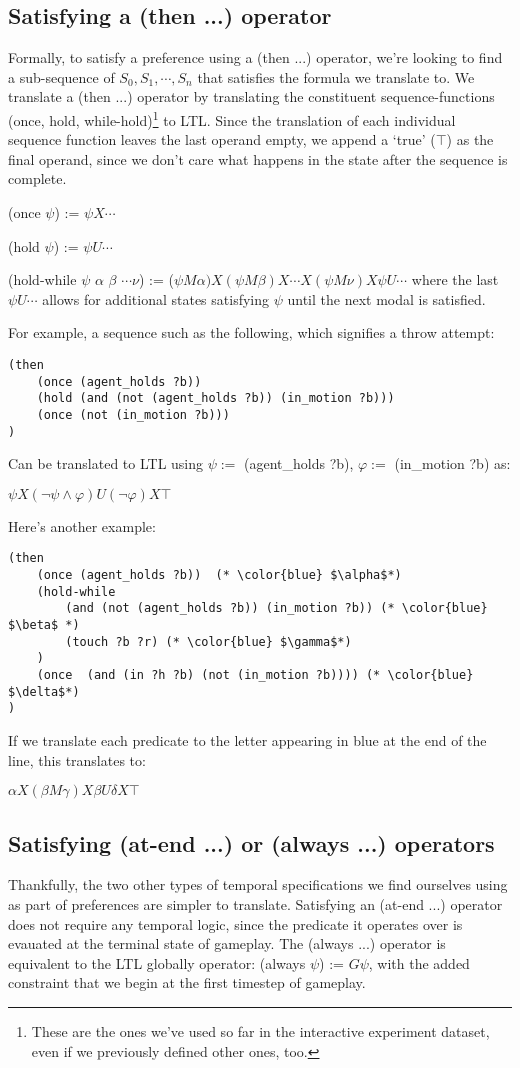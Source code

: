 \documentclass{article}
\begin{document}
\subsection{Satisfying a (then ...) operator}
Formally, to satisfy a preference using a (then ...) operator, we're looking to find a sub-sequence of $S_0, S_1, \cdots, S_n$ that satisfies the formula we translate to. 
We translate a (then ...) operator by translating the constituent sequence-functions (once, hold, while-hold)\footnote{These are the ones we've used so far in the interactive experiment dataset, even if we previously defined other ones, too.} to LTL. 
Since the translation of each individual sequence function leaves the last operand empty, we append a `true' ($\top$) as the final operand, since we don't care what happens in the state after the sequence is complete. 

(once $\psi$) := $\psi X \cdots$

(hold $\psi$) := $\psi U \cdots$

(hold-while $\psi$ $\alpha$ $\beta$ $\cdots \nu$) := ($\psi M \alpha) X (\psi M \beta) X \cdots X (\psi M \nu) X \psi U \cdots$ where the last $\psi U \cdots$ allows for additional states satisfying $\psi$ until the next modal is satisfied.

For example, a sequence such as the following, which signifies a throw attempt:
\begin{lstlisting}
(then
    (once (agent_holds ?b))
    (hold (and (not (agent_holds ?b)) (in_motion ?b))) 
    (once (not (in_motion ?b)))
)
\end{lstlisting}
Can be translated to LTL using $\psi:=$ (agent_holds ?b), $\varphi:=$ (in_motion ?b) as:

$\psi X (\neg \psi \wedge \varphi) U (\neg \varphi) X \top $

Here's another example: 
\begin{lstlisting}
(then 
    (once (agent_holds ?b))  (* \color{blue} $\alpha$*)
    (hold-while 
        (and (not (agent_holds ?b)) (in_motion ?b)) (* \color{blue} $\beta$ *)
        (touch ?b ?r) (* \color{blue} $\gamma$*)
    ) 
    (once  (and (in ?h ?b) (not (in_motion ?b)))) (* \color{blue} $\delta$*) 
)
\end{lstlisting}
If we translate each predicate to the letter appearing in blue at the end of the line, this translates to:

$\alpha X (\beta M \gamma) X \beta U \delta X \top$

\subsection{Satisfying (at-end ...) or (always ...) operators}
Thankfully, the two other types of temporal specifications we find ourselves using as part of preferences are simpler to translate. 
Satisfying an (at-end ...) operator does not require any temporal logic, since the predicate it operates over is evauated at the terminal state of gameplay.
The (always ...) operator is equivalent to the LTL globally operator: (always $\psi$) := $G \psi$, with the added constraint that we begin at the first timestep of gameplay. 
\end{document}
